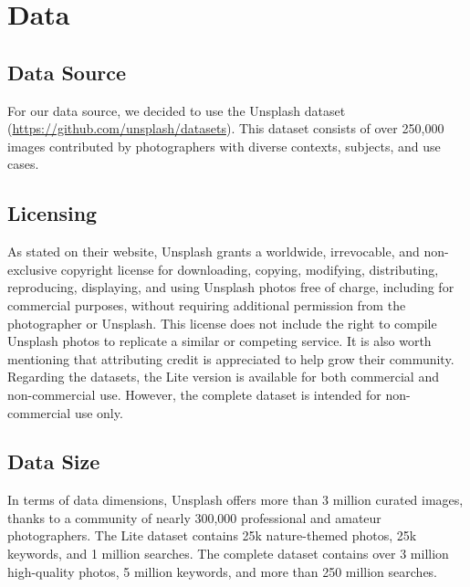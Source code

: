 \documentclass{article}
\begin{document}
    \section{Data}\label{sec:data}

    \subsection{Data Source}\label{subsec:data_source}
    For our data source, we decided to use the Unsplash dataset (\url{https://github.com/unsplash/datasets}).
    This dataset consists of over 250,000 images contributed by photographers with diverse contexts, subjects, and use cases.

    \subsection{Licensing}\label{subsec:licensing}
    As stated on their website, Unsplash grants a worldwide, irrevocable, and non-exclusive copyright license for
    downloading, copying, modifying, distributing, reproducing, displaying, and using Unsplash photos free of charge, including for commercial purposes, without requiring additional permission from the photographer or Unsplash.
    This license does not include the right to compile Unsplash photos to replicate a similar or competing service.
    It is also worth mentioning that attributing credit is appreciated to help grow their community.
    Regarding the datasets, the Lite version is available for both commercial and non-commercial use.
    However, the complete dataset is intended for non-commercial use only.

    \subsection{Data Size}\label{subsec:data_size}
    In terms of data dimensions, Unsplash offers more than 3 million curated images, thanks to a community of nearly 300,000 professional and amateur photographers.
    The Lite dataset contains 25k nature-themed photos, 25k keywords, and 1 million searches.
    The complete dataset contains over 3 million high-quality photos, 5 million keywords, and more than 250 million searches.
\end{document}
